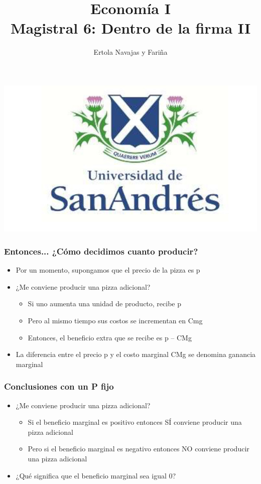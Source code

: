 \documentclass{beamer}
\title[Economía I]{Economía I \vspace{4mm}
\\ Magistral 6: Dentro de la firma II}
\date{}
\author[Ertola Navajas y Fariña]{Ertola Navajas y Fariña}
\institute[]{Universidad de San Andrés}
\begin{document}
\begin{frame}
\titlepage
\centering
\includegraphics[scale=0.2]{Slides Principios de Economia/Figures/logoUDESA.jpg} 
\end{frame}



\begin{frame}
\frametitle{Entonces... ¿Cómo decidimos cuanto producir?}
\begin{itemize}
    \item Por un momento, supongamos que el precio de la pizza es p
        \item ¿Me conviene producir una pizza adicional?     
    \begin{itemize}
        \item Si uno aumenta una unidad de producto, recibe p
        \item Pero al mismo tiempo sus costos se incrementan en Cmg
        \item Entonces, el beneficio extra que se recibe es p – CMg
        \end{itemize}
    \item La diferencia entre el precio p y el costo marginal CMg se denomina ganancia marginal
\end{itemize}
\end{frame}

\begin{frame}
\frametitle{Conclusiones con un P fijo}
\begin{itemize}
    \item ¿Me conviene producir una pizza adicional?
        \begin{itemize}
        \item Si el beneficio marginal es positivo entonces SÍ conviene producir una pizza adicional
        \item Pero si el beneficio marginal es negativo entonces NO conviene producir una pizza adicional
        \end{itemize} 
    \item ¿Qué significa que el beneficio marginal sea igual 0?
\end{itemize}
\end{frame}
\end{document}
